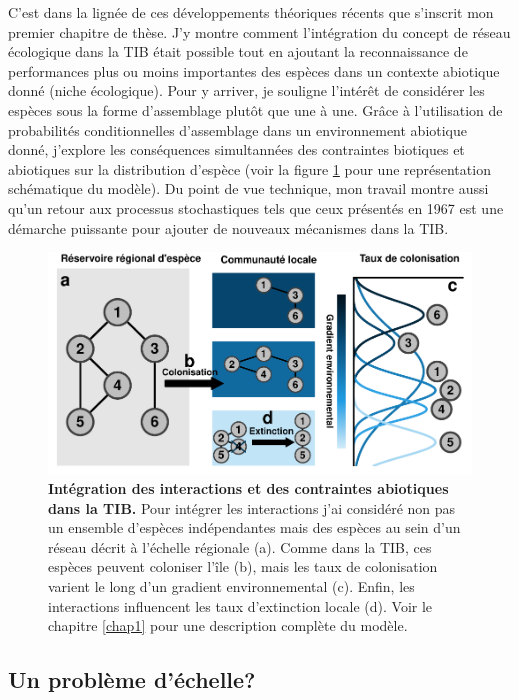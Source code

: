 C'est dans la lignée de ces développements théoriques récents que
s'inscrit mon premier chapitre de thèse. J'y montre comment
l'intégration du concept de réseau écologique dans la TIB était possible
tout en ajoutant la reconnaissance de performances plus ou moins
importantes des espèces dans un contexte abiotique donné (niche
écologique). Pour y arriver, je souligne l'intérêt de considérer les
espèces sous la forme d'assemblage plutôt que une à une. Grâce à
l'utilisation de probabilités conditionnelles d'assemblage dans un
environnement abiotique donné, j'explore les conséquences simultannées
des contraintes biotiques et abiotiques sur la distribution d'espèce
(voir la figure \ref{fig:figGTIB} pour une représentation schématique du
modèle). Du point de vue technique, mon travail montre aussi qu'un
retour aux processus stochastiques tels que ceux présentés en 1967 est
une démarche puissante pour ajouter de nouveaux mécanismes dans la TIB.

\begin{figure}
\centering
\includegraphics{fig/fig2.pdf}
\caption{\textbf{Intégration des interactions et des contraintes
abiotiques dans la TIB.} Pour intégrer les interactions j'ai considéré
non pas un ensemble d'espèces indépendantes mais des espèces au sein
d'un réseau décrit à l'échelle régionale (a). Comme dans la TIB, ces
espèces peuvent coloniser l'île (b), mais les taux de colonisation
varient le long d'un gradient environnemental (c). Enfin, les
interactions influencent les taux d'extinction locale (d). Voir le
chapitre \ref{chap1} pour une description complète du
modèle.\label{fig:figGTIB}}
\end{figure}

\subsection*{Un problème d'échelle?}\label{un-probluxe8me-duxe9chelle}

